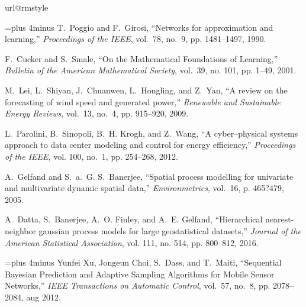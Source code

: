 \documentclass[10pt,twocolumn,twoside]{IEEEtran}					%
\theoremstyle	{plain}
\begin{document}
\begin{thebibliography}{10}
\providecommand{\url}[1]{#1}
\csname url@rmstyle\endcsname
\providecommand{\newblock}{\relax}
\providecommand{\bibinfo}[2]{#2}
\providecommand\BIBentrySTDinterwordspacing{\spaceskip=0pt\relax}
\providecommand\BIBentryALTinterwordstretchfactor{4}
\providecommand\BIBentryALTinterwordspacing{\spaceskip=\fontdimen2\font plus
\BIBentryALTinterwordstretchfactor\fontdimen3\font minus
  \fontdimen4\font\relax}
\providecommand\BIBforeignlanguage[2]{{%
\expandafter\ifx\csname l@#1\endcsname\relax
\typeout{** WARNING: IEEEtran.bst: No hyphenation pattern has been}%
\typeout{** loaded for the language `#1'. Using the pattern for}%
\typeout{** the default language instead.}%
\else
\language=\csname l@#1\endcsname
\fi
#2}}

\BIBentryALTinterwordspacing
T.~Poggio and F.~Girosi, ``{Networks for approximation and learning},''
  \emph{Proceedings of the IEEE}, vol.~78, no.~9, pp. 1481--1497, 1990.
\BIBentrySTDinterwordspacing

F.~Cucker and S.~Smale, ``{On the Mathematical Foundations of Learning},''
  \emph{Bulletin of the American Mathematical Society}, vol.~39, no. 101, pp.
  1--49, 2001.

M.~Lei, L.~Shiyan, J.~Chuanwen, L.~Hongling, and Z.~Yan, ``A review on the
  forecasting of wind speed and generated power,'' \emph{Renewable and
  Sustainable Energy Reviews}, vol.~13, no.~4, pp. 915--920, 2009.

L.~Parolini, B.~Sinopoli, B.~H. Krogh, and Z.~Wang, ``A cyber--physical systems
  approach to data center modeling and control for energy efficiency,''
  \emph{Proceedings of the IEEE}, vol. 100, no.~1, pp. 254--268, 2012.

A.~Gelfand and S.~a.~G. S.~Banerjee, ``Spatial process modelling for univariate
  and multivariate dynamic spatial data,'' \emph{Environmetrics}, vol.~16, p.
  465?479, 2005.

A.~Datta, S.~Banerjee, A.~O. Finley, and A.~E. Gelfand, ``Hierarchical
  nearest-neighbor gaussian process models for large geostatistical datasets,''
  \emph{Journal of the American Statistical Association}, vol. 111, no. 514,
  pp. 800--812, 2016.

\BIBentryALTinterwordspacing
{Yunfei Xu}, {Jongeun Choi}, S.~Dass, and T.~Maiti, ``{Sequential Bayesian
  Prediction and Adaptive Sampling Algorithms for Mobile Sensor Networks},''
  \emph{IEEE Transactions on Automatic Control}, vol.~57, no.~8, pp.
  2078--2084, aug 2012.
\BIBentrySTDinterwordspacing


\end{thebibliography}
\end{document}
